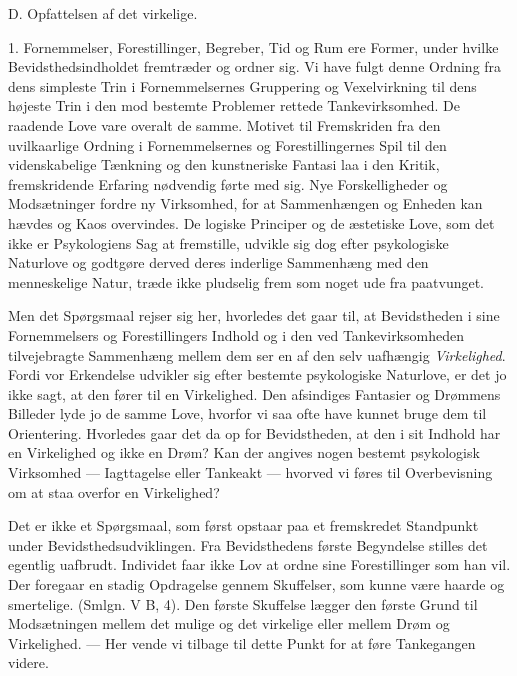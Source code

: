 \documentclass[12pt,a4paper,openany]{book}
\newcommand{\opage}[1]{\marginnote{\footnotesize\textit{[#1]}}}
\begin{document}
\opage{251}
\begin{center}D. Opfattelsen af det virkelige.\end{center}

1. Fornemmelser, Forestillinger, Begreber, Tid og Rum ere Former, under
hvilke Bevidsthedsindholdet fremtræder og ordner sig. Vi have fulgt
denne Ordning fra dens simpleste Trin i Fornemmelsernes Gruppering og
Vexelvirkning til dens højeste Trin i den mod bestemte Problemer rettede
Tankevirksomhed. De raadende Love vare overalt de samme. Motivet til
Fremskriden fra den uvilkaarlige Ordning i Fornemmelsernes og
Forestillingernes Spil til den videnskabelige Tænkning og den
kunstneriske Fantasi laa i den Kritik, fremskridende Erfaring nødvendig
førte med sig. Nye Forskelligheder og Modsætninger fordre ny Virksomhed,
for at Sammenhængen og Enheden kan hævdes og Kaos overvindes. De logiske
Principer og de æstetiske Love, som det ikke er Psykologiens Sag at
fremstille, udvikle sig dog efter psykologiske Naturlove og godtgøre
derved deres inderlige Sammenhæng med den menneskelige Natur, træde ikke
pludselig frem som noget ude fra paatvunget.

Men det Spørgsmaal rejser sig her, hvorledes det gaar til, at
Bevidstheden i sine Fornemmelsers og Forestillingers Indhold og i den
ved Tankevirksomheden tilvejebragte Sammenhæng mellem dem ser en af den
selv uafhængig \emph{Virkelighed}. Fordi vor Erkendelse udvikler sig
efter bestemte psykologiske Naturlove, er det jo ikke sagt, at den fører
til en Virkelighed. Den afsindiges Fantasier og Drømmens Billeder lyde
jo de samme Love, hvorfor vi saa ofte have kunnet bruge dem til
Orientering. Hvorledes gaar det da op for Bevidstheden, at den i sit
Indhold har en Virkelighed og ikke en Drøm? Kan der angives nogen
bestemt psykologisk Virksomhed --- Iagttagelse eller Tankeakt ---
hvorved vi føres til Overbevisning om at staa overfor en Virkelighed?

Det er ikke et Spørgsmaal, som først opstaar paa et fremskredet
Standpunkt under Bevidsthedsudviklingen. Fra Bevidsthedens første
Begyndelse stilles det egentlig uafbrudt. Individet faar ikke Lov at
ordne sine Forestillinger som han vil. Der foregaar en stadig Opdragelse
gennem Skuffelser, som kunne være haarde og smertelige. (Smlgn. V B, 4).
Den første Skuffelse lægger den første Grund til Modsætningen
\opage{252}mellem det mulige og det virkelige eller mellem Drøm og
Virkelighed. --- Her vende vi tilbage til dette Punkt for at føre
Tankegangen videre.
\end{document}
